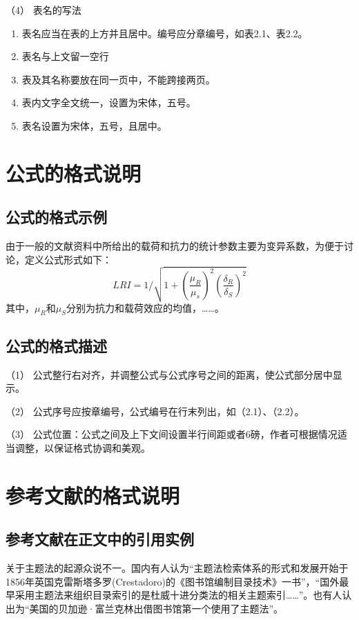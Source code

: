 （4） 表名的写法
\begin{enumerate}[label=\circled{\arabic*}]
\item 表名应当在表的上方并且居中。编号应分章编号，如表2.1、表2.2。
\item 表名与上文留一空行
\item 表及其名称要放在同一页中，不能跨接两页。
\item 表内文字全文统一，设置为宋体，五号。
\item 表名设置为宋体，五号，且居中。
\end{enumerate}

\section{公式的格式说明}
\subsection{公式的格式示例}
由于一般的文献资料中所给出的载荷和抗力的统计参数主要为变异系数，为便于讨论，定义公式形式如下：
\begin{equation}
LRI = 1/\sqrt{1+(\frac{\mu_R}{\mu_s})^2(\frac{\delta_R}{\delta_S})^2}
\end{equation}
其中，$\mu_R$和$\mu_S$分别为抗力和载荷效应的均值，……。

\subsection{公式的格式描述}
（1） 公式整行右对齐，并调整公式与公式序号之间的距离，使公式部分居中显示。

（2） 公式序号应按章编号，公式编号在行末列出，如（2.1）、（2.2）。

（3） 公式位置：公式之间及上下文间设置半行间距或者6磅，作者可根据情况适当调整，以保证格式协调和美观。

\section{参考文献的格式说明}
\subsection{参考文献在正文中的引用实例}
关于主题法的起源众说不一。国内有人认为“主题法检索体系的形式和发展开始于1856年英国克雷斯塔多罗(Crestadoro)的《图书馆编制目录技术》一书”，“国外最早采用主题法来组织目录索引的是杜威十进分类法的相关主题索引……”。也有人认出为“美国的贝加逊·富兰克林出借图书馆第一个使用了主题法”。

